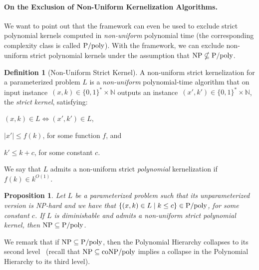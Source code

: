 \documentclass[11pt,a4,USenglish]{article}
\newcommand{\coNP}{\textnormal{coNP}}
\newcommand{\coNPslashpoly}{\textnormal{\coNP{}$/$poly}}
\newcommand{\NP}{\textnormal{NP}}
\newcommand{\PTIME}{\textnormal{P}}
\newcommand{\NPincoNPslashpoly}{$\NP{}\subseteq\coNPslashpoly{}$}
\theoremstyle{definition}
\newtheorem{defi}{Definition}
\theoremstyle{plain}
\newtheorem{proposition}{Proposition}
\theoremstyle{remark}
\begin{document}
\paragraph{On the Exclusion of Non-Uniform Kernelization Algorithms.}
We want to point out that the framework can even be used to exclude strict polynomial kernels computed in \emph{non-uniform} polynomial time (the corresponding complexity class is called $\PTIME / \text{poly}$). With the framework, we can exclude non-uniform strict polynomial kernels under the assumption that $\NP \nsubseteq \PTIME/\text{poly}$. 
\begin{defi}[Non-Uniform Strict Kernel]
\label{def:strictPK}
A non-uniform strict kernelization for a parameterized problem $L$ is a \emph{non-uniform} polynomial-time algorithm that on input instance~$(x,k) \in \{0,1\}^* \times \mathbb{N}$ outputs an instance~$(x',k')\in \{0,1\}^* \times \mathbb{N}$, the \emph{strict kernel}, satisfying:
%
%
\begin{inparaenum}[(i)]
\item $(x, k) \in L \iff (x', k') \in L$,
\item $|x'| \le f(k)$, for some function $f$, and
\item $k' \le k + c$, for some constant $c$.
\end{inparaenum}
%
%
We say that $L$ admits a non-uniform strict \emph{polynomial} kernelization if $f(k)\in k^{O(1)}$.
%
\end{defi}
%
\begin{proposition}
\label{prop:non-uniform}
Let $L$ be a parameterized problem such that its unparameterized version is \NP{}-hard and we have that $\{(x,k)\in L\mid k\le c\}\in \PTIME{}/\textnormal{poly}$, for some constant $c$. %
If $L$ is diminishable and admits a non-uniform strict polynomial kernel, then $\NP \subseteq \PTIME/\textnormal{poly}$.
\end{proposition}
%
We remark that if $\NP \subseteq \PTIME/\textnormal{poly}$, then the Polynomial Hierarchy collapses to its second level~\cite{karp1982turing} (recall that \NPincoNPslashpoly{} implies a collapse in the Polynomial Hierarchy to its third level).
%
\end{document}
